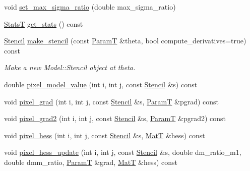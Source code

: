 \begin{DoxyCompactItemize}
\item 
void \hyperlink{classmappel_1_1Gauss2DsModel_a85925eaef6d69c5f6b3ceeae3364dd68}{set\+\_\+max\+\_\+sigma\+\_\+ratio} (double max\+\_\+sigma\+\_\+ratio)
\item 
\hyperlink{namespacemappel_a04ab395b0cf82c4ce68a36b2212649a5}{StatsT} \hyperlink{classmappel_1_1Gauss2DsModel_a9c59a143645ffdacd13b1dc332828cfb}{get\+\_\+stats} () const 
\item 
\hyperlink{classmappel_1_1Gauss2DsModel_1_1Stencil}{Stencil} \hyperlink{classmappel_1_1Gauss2DsModel_a797aeb7c17a24a7df89597789a0eacb4}{make\+\_\+stencil} (const \hyperlink{classmappel_1_1PointEmitterModel_a665ec6aea3aac139bb69a23c06d4b9a1}{ParamT} \&theta, bool compute\+\_\+derivatives=true) const 
\begin{DoxyCompactList}\small\item\em Make a new Model\+::\+Stencil object at theta. \end{DoxyCompactList}\item 
double \hyperlink{classmappel_1_1Gauss2DsModel_adab5850638261d71b88e1879fd22ff00}{pixel\+\_\+model\+\_\+value} (int i, int j, const \hyperlink{classmappel_1_1Gauss2DsModel_1_1Stencil}{Stencil} \&s) const 
\item 
void \hyperlink{classmappel_1_1Gauss2DsModel_a8c46a4ca74f2aa48e6607fb998a2e22d}{pixel\+\_\+grad} (int i, int j, const \hyperlink{classmappel_1_1Gauss2DsModel_1_1Stencil}{Stencil} \&s, \hyperlink{classmappel_1_1PointEmitterModel_a665ec6aea3aac139bb69a23c06d4b9a1}{ParamT} \&pgrad) const 
\item 
void \hyperlink{classmappel_1_1Gauss2DsModel_a3775c60f914e1873ecfcd67c64fbc1e8}{pixel\+\_\+grad2} (int i, int j, const \hyperlink{classmappel_1_1Gauss2DsModel_1_1Stencil}{Stencil} \&s, \hyperlink{classmappel_1_1PointEmitterModel_a665ec6aea3aac139bb69a23c06d4b9a1}{ParamT} \&pgrad2) const 
\item 
void \hyperlink{classmappel_1_1Gauss2DsModel_a4f80f81e88e02ce3be7c6e5052236ae2}{pixel\+\_\+hess} (int i, int j, const \hyperlink{classmappel_1_1Gauss2DsModel_1_1Stencil}{Stencil} \&s, \hyperlink{namespacemappel_a7091ab87c528041f7e2027195fad8915}{MatT} \&hess) const 
\item 
void \hyperlink{classmappel_1_1Gauss2DsModel_abc9ec137a0cf5238a34b9c041e3fc3a5}{pixel\+\_\+hess\+\_\+update} (int i, int j, const \hyperlink{classmappel_1_1Gauss2DsModel_1_1Stencil}{Stencil} \&s, double dm\+\_\+ratio\+\_\+m1, double dmm\+\_\+ratio, \hyperlink{classmappel_1_1PointEmitterModel_a665ec6aea3aac139bb69a23c06d4b9a1}{ParamT} \&grad, \hyperlink{namespacemappel_a7091ab87c528041f7e2027195fad8915}{MatT} \&hess) const 

\end{DoxyCompactItemize}
